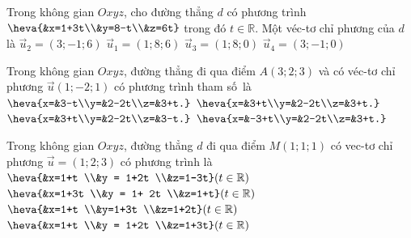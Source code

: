 \begin{ex}%
	Trong không gian  $Oxyz$, cho đường thẳng $d$ có phương trình $\heva{&x=1+3t\\&y=8-t\\&z=6t}$ trong đó $t\in\mathbb{R}$. Một véc-tơ chỉ phương của $d$ là
	 \choice
		 {\True $\overrightarrow{u}_{2}=(3;-1;6)$}
		{$\overrightarrow{u}_{1}=(1;8;6)$} 
		 {$\overrightarrow{u}_{3}=(1;8;0)$}
		{$\overrightarrow{u}_{4}=(3;-1;0)$} 
\end{ex}

\begin{ex}%
	Trong không gian $ Oxyz$, đường thẳng đi qua điểm ${A}\left(3;2;3\right)$  và có véc-tơ chỉ phương ${\overrightarrow{u}}\left(1;-2;1\right)$ có phương trình tham số~là
	\renewcommand{\dotEX}{} 
	 \choice
		{$\heva{x=&3-t\\y=&2-2t\\z=&3+t.}$} 
		 {\True $\heva{x=&3+t\\y=&2-2t\\z=&3+t.}$}
		{$\heva{x=&3+t\\y=&2-2t\\z=&3-t.}$} 
		{$\heva{x=&-3+t\\y=&2-2t\\z=&3+t.}$} 
\end{ex}

\begin{ex}%
	Trong không  gian $Oxyz$, đường thẳng $d$ đi qua điểm $M(1;1;1)$ có vec-tơ chỉ phương $\overrightarrow{u} = (1;2;3)$ có phương trình là
	\choice 
		{$\heva{&x=1+t \\&y = 1+2t  \\&z=1-3t}(t\in\mathbb{R})$}
		{$\heva{&x=1+3t \\&y = 1+ 2t \\&z=1+t}(t\in  \mathbb{R})$}
		{$\heva{&x=1+t \\&y=1+3t \\&z=1+2t}(t\in\mathbb{R})$} 
		{\True $\heva{&x=1+t \\&y = 1+2t \\&z=1+3t}(t\in \mathbb{R})$} 
\end{ex}

